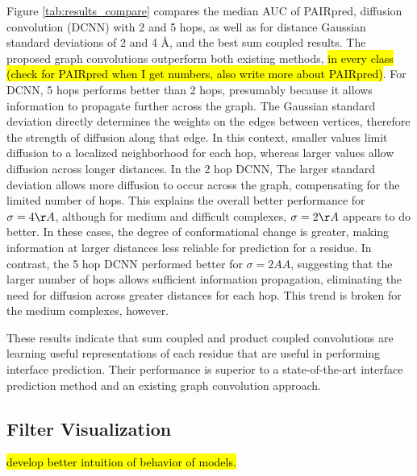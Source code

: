 Figure \ref{tab:results_compare} compares the median AUC of PAIRpred, diffusion convolution (DCNN) with 2 and 5 hops, as well as for distance Gaussian standard deviations of 2 and 4 \AA{}, and the best sum coupled results.
The proposed graph convolutions outperform both existing methods, \hl{in every class (check for PAIRpred when I get numbers, also write more about PAIRpred)}.
For DCNN, 5 hops performs better than 2 hops, presumably because it allows information to propagate further across the graph.
The Gaussian standard deviation directly determines the weights on the edges between vertices, therefore the strength of diffusion along that edge.
In this context, smaller values limit diffusion to a localized neighborhood for each hop, whereas larger values allow diffusion across longer distances.
In the 2 hop DCNN, The larger standard deviation allows more diffusion to occur across the graph, compensating for the limited number of hops.
This explains the overall better performance for $\sigma=4\AA{}$, although for medium and difficult complexes, $\sigma=2\AA{}$ appears to do better. 
In these cases, the degree of conformational change is greater, making information at larger distances less reliable for prediction for a residue.
In contrast, the 5 hop DCNN performed better for $\sigma=2AA{}$, suggesting that the larger number of hops allows sufficient information propagation, eliminating the need for diffusion across greater distances for each hop.
This trend is broken for the medium complexes, however.

These results indicate that sum coupled and product coupled convolutions are learning useful representations of each residue that are useful in performing interface prediction.
Their performance is superior to a state-of-the-art interface prediction method and an existing graph convolution approach. 



\subsection{Filter Visualization}

\hl{develop better intuition of behavior of models.}